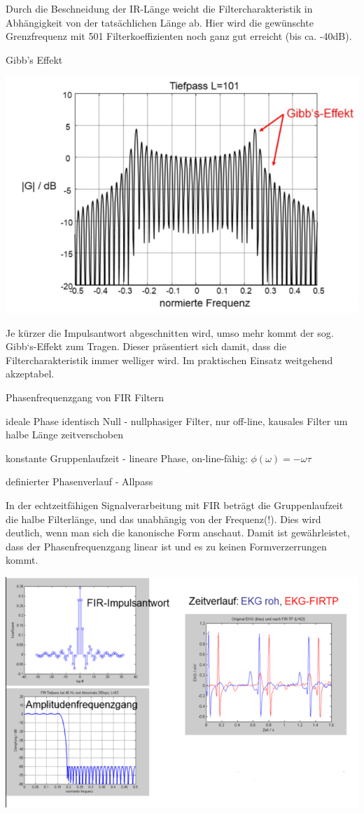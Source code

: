 \documentclass[a4paper]{article}
\begin{document}
\begin{multicols}{3}
\begin{itemize*}
\begin{itemize*}
      \item Durch die Beschneidung der IR-Länge weicht die Filtercharakteristik in Abhängigkeit von der tatsächlichen Länge ab. Hier wird die gewünschte Grenzfrequenz mit 501 Filterkoeffizienten noch ganz gut erreicht (bis ca. -40dB).
    \end{itemize*}
    \item Gibb's Effekt
    \begin{itemize*}
      \item \includegraphics[width=.5\linewidth]{Assets/Biosignalverarbeitung-gibbs-effekt.png}
      \item Je kürzer die Impulsantwort abgeschnitten wird, umso mehr kommt der sog. Gibb`s-Effekt zum Tragen. Dieser präsentiert sich damit, dass die Filtercharakteristik immer welliger wird. Im praktischen Einsatz weitgehend akzeptabel.
    \end{itemize*}
  \end{itemize*}

  Phasenfrequenzgang von FIR Filtern

  \begin{itemize*}
    \item ideale Phase identisch Null - nullphasiger Filter, nur off-line, kausales Filter um halbe Länge zeitverschoben
    \item konstante Gruppenlaufzeit - lineare Phase, on-line-fähig: $\phi(\omega)=-\omega\tau$
    \item definierter Phasenverlauf - Allpass
    \item In der echtzeitfähigen Signalverarbeitung mit FIR beträgt die Gruppenlaufzeit die halbe Filterlänge, und das unabhängig von der Frequenz(!). Dies wird deutlich, wenn man sich die kanonische Form anschaut. Damit ist gewährleistet, dass der Phasenfrequenzgang linear ist und es zu keinen Formverzerrungen kommt.
  \end{itemize*}

  \includegraphics[width=.5\linewidth]{Assets/Biosignalverarbeitung-fir-tiefpass-4.png}


\end{multicols}
\end{document}
